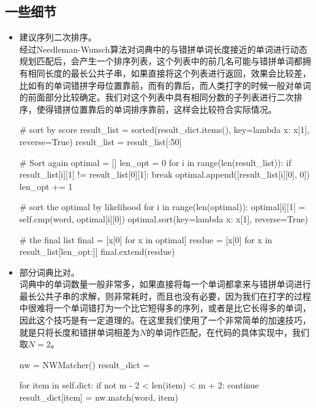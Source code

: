 \documentclass[UTF8,a4paper]{ctexart}
\begin{document}
\subsection{一些细节}

\begin{itemize}
\item 建议序列二次排序。\\
经过Needleman-Wunsch算法对词典中的与错拼单词长度接近的单词进行动态规划匹配后，会产生一个排序列表，这个列表中的前几名可能与错拼单词都拥有相同长度的最长公共子串，如果直接将这个列表进行返回，效果会比较差，比如有的单词错拼字母位置靠前，而有的靠后，而人类打字的时候一般对单词的前面部分比较确定。我们对这个列表中具有相同分数的子列表进行二次排序，使得错拼位置靠后的单词排序靠前，这样会比较符合实际情况。

\begin{python}
# sort by score
result_list = sorted(result_dict.items(), key=lambda x: x[1], reverse=True)
result_list = result_list[:50]

# Sort again
optimal = []
len_opt = 0
for i in range(len(result_list)):
    if result_list[i][1] != result_list[0][1]:
        break
    optimal.append([result_list[i][0], 0])
    len_opt += 1

# sort the optimal by likelihood
for i in range(len(optimal)):
    optimal[i][1] = self.cmp(word, optimal[i][0])
optimal.sort(key=lambda x: x[1], reverse=True)

# the final list
final = [x[0] for x in optimal]
resdue = [x[0] for x in result_list[len_opt:]]
final.extend(resdue)
\end{python}

\item 部分词典比对。\\
词典中的单词数量一般非常多，如果直接将每一个单词都拿来与错拼单词进行最长公共子串的求解，则非常耗时，而且也没有必要，因为我们在打字的过程中很难将一个单词错打为一个比它短得多的序列，或者是比它长得多的单词，因此这个技巧是有一定道理的。在这里我们使用了一个非常简单的加速技巧，就是只将长度和错拼单词相差为$N$的单词作匹配，在代码的具体实现中，我们取$N=2$。

\begin{python}
nw = NWMatcher()
result_dict = {}

for item in self.dict:
    if not m - 2 < len(item) < m + 2:
        continue
    result_dict[item] = nw.match(word, item)
\end{python}

\end{itemize}
\end{document}
